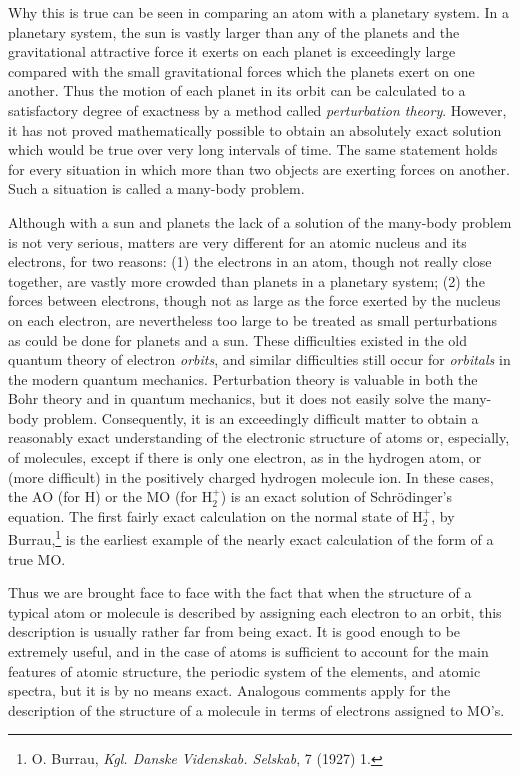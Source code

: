 \documentclass[11pt]{memoir}
\begin{document}
Why this is true can be seen in comparing an atom with a planetary system.  In a planetary system, the sun is vastly larger than any of the planets and the gravitational attractive force it exerts on each planet is exceedingly large compared with the small gravitational forces which the planets exert on one another.  Thus the motion of each planet in its orbit can be calculated to a satisfactory degree of exactness by a method called \emph{perturbation theory}.  However, it has not proved mathematically possible to obtain an absolutely exact solution which would be true over very long intervals of time.  The same statement holds for every situation in which more than two objects are exerting forces on another.  Such a situation is called a many-body problem.

Although with a sun and planets the lack of a solution of the many-body problem is not very serious, matters are very different for an atomic nucleus and its electrons, for two reasons: (1) the electrons in an atom, though not really close together, are vastly more crowded than planets in a planetary system; (2) the forces between electrons, though not as large as the force exerted by the nucleus on each electron, are nevertheless too large to be treated as small perturbations as could be done for planets and a sun.  These difficulties existed in the old quantum theory of electron \emph{orbits}, and similar difficulties still occur for \emph{orbitals} in the modern quantum mechanics.  Perturbation theory is valuable in both the Bohr theory and in quantum mechanics, but it does not easily solve the many-body problem.  Consequently, it is an exceedingly difficult matter to obtain a reasonably exact understanding of the electronic structure of atoms or, especially, of molecules, except if there is only one electron, as in the hydrogen atom, or (more difficult) in the positively charged hydrogen molecule ion.  In these cases, the AO (for H) or the MO (for $\mathrm{H_2^+}$) is an exact solution of Schr\"{o}dinger's equation.  The first fairly exact calculation on the normal state of $\mathrm{H_2^+}$, by Burrau,\footnote{O. Burrau, \emph{Kgl. Danske Videnskab. Selskab}, 7 (1927) 1.} is the earliest example of the nearly exact calculation of the form of a true MO.

Thus we are brought face to face with the fact that when the structure of a typical atom or molecule is described by assigning each electron to an orbit, this description is usually rather far from being exact.  It is good enough to be extremely useful, and in the case of atoms is sufficient to account for the main features of atomic structure, the periodic system of the elements, and atomic spectra, but it is by no means exact.  Analogous comments apply for the description of the structure of a molecule in terms of electrons assigned to MO's.
\end{document}
